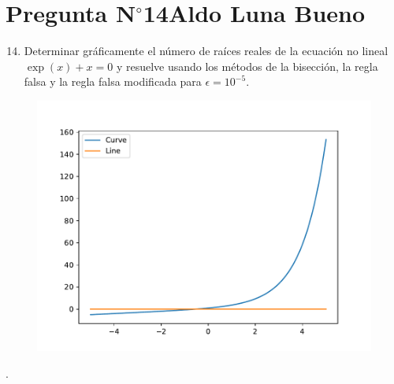 \section{Pregunta N$^{\circ}$14\qquad Aldo Luna Bueno}

\begin{frame}
	\begin{enumerate}\setcounter{enumi}{13}
		\item

		      Determinar gráficamente el número de raíces reales de la
		      ecuación no lineal
		      \begin{math}
			      \exp\left(x\right)+x=
			      0
		      \end{math}
		      y resuelve usando los métodos de la bisección, la regla
		      falsa y la regla falsa modificada para $\epsilon=10^{-5}$.

	\end{enumerate}

	\begin{solution}

		\begin{figure}
			\includegraphics[width=0.5\paperwidth]{p14.pdf}
		\end{figure}
	\end{solution}
\end{frame}

\begin{frame}
	\begin{solution}

		.
	\end{solution}
\end{frame}